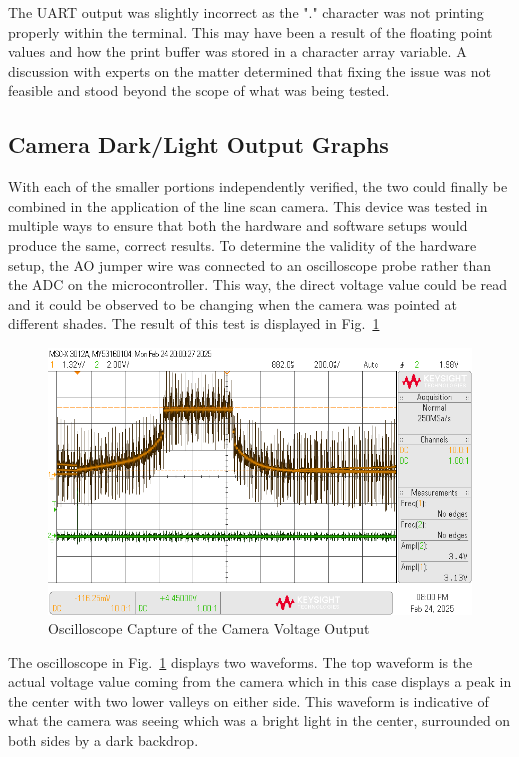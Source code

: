\documentclass[conference]{IEEEtran}
\begin{document}
The UART output was slightly incorrect as the "." character was not printing
properly within the terminal. This may have been a result of the floating
point values and how the print buffer was stored in a character array
variable. A discussion with experts on the matter determined that fixing the
issue was not feasible and stood beyond the scope of what was being tested.

\subsection{Camera Dark/Light Output Graphs}

With each of the smaller portions independently verified, the two could
finally be combined in the application of the line scan camera. This device
was tested in multiple ways to ensure that both the hardware and software
setups would produce the same, correct results. To determine the validity of
the hardware setup, the AO jumper wire was connected to an oscilloscope probe
rather than the ADC on the microcontroller. This way, the direct voltage value
could be read and it could be observed to be changing when the camera was
pointed at different shades. The result of this test is displayed in
Fig.~\ref{oscilloscope}

\begin{figure}
    \centering
    \includegraphics[width=\linewidth]{images/part3scope.png}
    \caption{Oscilloscope Capture of the Camera Voltage Output}
    \label{oscilloscope}
\end{figure}

The oscilloscope in Fig.~\ref{oscilloscope} displays two waveforms. The top
waveform is the actual voltage value coming from the camera which in this case
displays a peak in the center with two lower valleys on either side. This
waveform is indicative of what the camera was seeing which was a bright light
in the center, surrounded on both sides by a dark backdrop.
\end{document}
